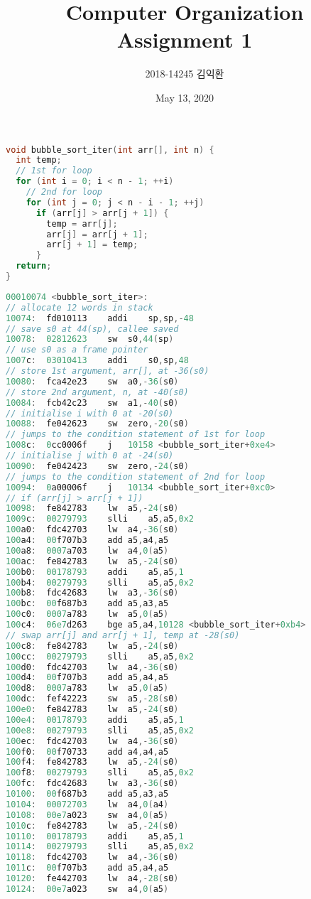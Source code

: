 \documentclass[
    a4paper,
    oneside,
    adjustmath,
    finemath,
    itemph,
    nonfrench,
    11pt
]{oblivoir}
\title{Computer Organization\\Assignment 1}
\author{2018-14245 김익환}
\date{May 13, 2020}
\begin{document}
    \maketitle
    \begin{lstlisting}[language=C, caption=Iterative bubble sort in C]
void bubble_sort_iter(int arr[], int n) {
  int temp;
  // 1st for loop
  for (int i = 0; i < n - 1; ++i)
    // 2nd for loop
    for (int j = 0; j < n - i - 1; ++j)
      if (arr[j] > arr[j + 1]) {
        temp = arr[j];
        arr[j] = arr[j + 1];
        arr[j + 1] = temp;
      }
  return;
}
    \end{lstlisting}
    \begin{lstlisting}[language=C, caption=Iterative bubble sort in RV32I]
00010074 <bubble_sort_iter>:
// allocate 12 words in stack
10074:	fd010113	addi	sp,sp,-48
// save s0 at 44(sp), callee saved
10078:	02812623	sw	s0,44(sp)
// use s0 as a frame pointer
1007c:	03010413	addi	s0,sp,48
// store 1st argument, arr[], at -36(s0)
10080:	fca42e23	sw	a0,-36(s0)
// store 2nd argument, n, at -40(s0)
10084:	fcb42c23	sw	a1,-40(s0)
// initialise i with 0 at -20(s0)
10088:	fe042623	sw	zero,-20(s0)
// jumps to the condition statement of 1st for loop
1008c:	0cc0006f	j	10158 <bubble_sort_iter+0xe4>
// initialise j with 0 at -24(s0)
10090:	fe042423	sw	zero,-24(s0)
// jumps to the condition statement of 2nd for loop
10094:	0a00006f	j	10134 <bubble_sort_iter+0xc0>
// if (arr[j] > arr[j + 1])
10098:	fe842783	lw	a5,-24(s0)
1009c:	00279793	slli	a5,a5,0x2
100a0:	fdc42703	lw	a4,-36(s0)
100a4:	00f707b3	add	a5,a4,a5
100a8:	0007a703	lw	a4,0(a5)
100ac:	fe842783	lw	a5,-24(s0)
100b0:	00178793	addi	a5,a5,1
100b4:	00279793	slli	a5,a5,0x2
100b8:	fdc42683	lw	a3,-36(s0)
100bc:	00f687b3	add	a5,a3,a5
100c0:	0007a783	lw	a5,0(a5)
100c4:	06e7d263	bge	a5,a4,10128 <bubble_sort_iter+0xb4>
// swap arr[j] and arr[j + 1], temp at -28(s0)
100c8:	fe842783	lw	a5,-24(s0)
100cc:	00279793	slli	a5,a5,0x2
100d0:	fdc42703	lw	a4,-36(s0)
100d4:	00f707b3	add	a5,a4,a5
100d8:	0007a783	lw	a5,0(a5)
100dc:	fef42223	sw	a5,-28(s0)
100e0:	fe842783	lw	a5,-24(s0)
100e4:	00178793	addi	a5,a5,1
100e8:	00279793	slli	a5,a5,0x2
100ec:	fdc42703	lw	a4,-36(s0)
100f0:	00f70733	add	a4,a4,a5
100f4:	fe842783	lw	a5,-24(s0)
100f8:	00279793	slli	a5,a5,0x2
100fc:	fdc42683	lw	a3,-36(s0)
10100:	00f687b3	add	a5,a3,a5
10104:	00072703	lw	a4,0(a4)
10108:	00e7a023	sw	a4,0(a5)
1010c:	fe842783	lw	a5,-24(s0)
10110:	00178793	addi	a5,a5,1
10114:	00279793	slli	a5,a5,0x2
10118:	fdc42703	lw	a4,-36(s0)
1011c:	00f707b3	add	a5,a4,a5
10120:	fe442703	lw	a4,-28(s0)
10124:	00e7a023	sw	a4,0(a5)

\end{lstlisting}
\end{document}

